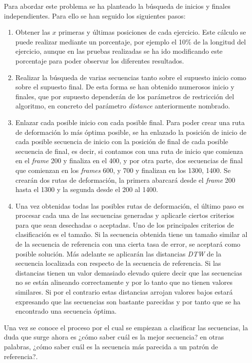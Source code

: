 Para abordar este problema se ha planteado la búsqueda de inicios y finales independientes. Para ello se han seguido los siguientes pasos:
\begin{enumerate}
    \item Obtener las $x$ primeras y últimas posiciones de cada ejercicio. Este cálculo se puede realizar mediante un porcentaje, por ejemplo el 10\% de la longitud del ejercicio, aunque en las pruebas realizadas se ha ido modificando este porcentaje para poder observar los diferentes resultados.
    \item Realizar la búsqueda de varias secuencias tanto sobre el supuesto inicio como sobre el supuesto final. De esta forma se han obtenido numerosos inicio y finales, que por supuesto dependerán de los parámetros de restricción del algoritmo, en concreto del parámetro \textit{distance} anteriormente nombrado.
    \item Enlazar cada posible inicio con cada posible final. Para poder crear una ruta de deformación lo más óptima posible, se ha enlazado la posición de inicio de cada posible secuencia de inicio con la posición de final de cada posible secuencia de final, es decir, si contamos con una ruta de inicio que comienza en el \textit{frame} 200 y finaliza en el 400, y por otra parte, dos secuencias de final que comienzan en los \textit{frames} 600, y 700 y finalizan en los 1300, 1400. Se crearán dos rutas de deformación, la primera abarcará desde el \textit{frame} 200 hasta el 1300 y la segunda desde el 200 al 1400.
    \item Una vez obtenidas todas las posibles rutas de deformación, el último paso es procesar cada una de las secuencias generadas y aplicarle ciertos criterios para que sean desechadas o aceptadas. Uno de los principales criterios de clasificación es el tamaño. Si la secuencia obtenida tiene un tamaño similar al de la secuencia de referencia con una cierta tasa de error, se aceptará como posible solución. Más adelante se aplicarán las distancias \emph{DTW} de la secuencia localizada con respecto de la secuencia de referencia. Si las distancias tienen un valor demasiado elevado quiere decir que las secuencias no se están alineando correctamente y por lo tanto que no tienen valores similares. Si por el contrario estas distancias arrojan valores bajos estará expresando que las secuencias son bastante parecidas y por tanto que se ha encontrado una secuencia óptima. 
\end{enumerate}

Una vez se conoce el proceso por el cual se empiezan a clasificar las secuencias, la duda que surge ahora es ¿cómo saber cuál es la mejor secuencia? en otras palabras, ¿cómo saber cuál es la secuencia más parecida a un patrón de referencia?.

